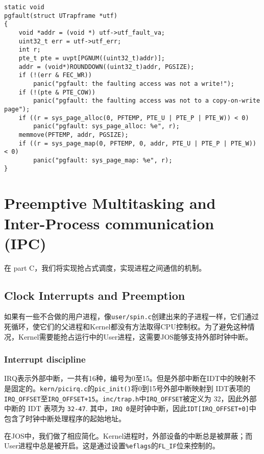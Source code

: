 \documentclass[11pt]{article}
\begin{document}
\begin{lstlisting}[title=lib/fork.c]
static void
pgfault(struct UTrapframe *utf)
{
	void *addr = (void *) utf->utf_fault_va;
	uint32_t err = utf->utf_err;
	int r;
 	pte_t pte = uvpt[PGNUM((uint32_t)addr)];
	addr = (void*)ROUNDDOWN((uint32_t)addr, PGSIZE);
	if (!(err & FEC_WR))
		panic("pgfault: the faulting access was not a write!");
	if (!(pte & PTE_COW))
		panic("pgfault: the faulting access was not to a copy-on-write page");
	if ((r = sys_page_alloc(0, PFTEMP, PTE_U | PTE_P | PTE_W)) < 0)
		panic("pgfault: sys_page_alloc: %e", r);
	memmove(PFTEMP, addr, PGSIZE); 
	if ((r = sys_page_map(0, PFTEMP, 0, addr, PTE_U | PTE_P | PTE_W)) < 0)
		panic("pgfault: sys_page_map: %e", r);
}
\end{lstlisting}
\section{Preemptive Multitasking and Inter-Process communication (IPC)}
在 part C，我们将实现抢占式调度，实现进程之间通信的机制。
\subsection{Clock Interrupts and Preemption}
如果有一些不合做的用户进程，像\lstinline|user/spin.c|创建出来的子进程一样，它们通过死循环，使它们的父进程和Kernel都没有方法取得CPU控制权。为了避免这种情况，Kernel需要能抢占运行中的User进程，这需要JOS能够支持外部时钟中断。 

\subsubsection{Interrupt discipline}
IRQ表示外部中断，一共有16种，编号为0至15。但是外部中断在IDT中的映射不是固定的。\lstinline|kern/picirq.c|的\lstinline|pic_init()|将0到15号外部中断映射到 IDT表项的\lstinline|IRQ_OFFSET|至\lstinline|IRQ_OFFSET+15|。\lstinline|inc/trap.h|中\lstinline|IRQ_OFFSET|被定义为 32，因此外部中断的 IDT 表项为 \lstinline|32-47|. 其中，\lstinline|IRQ 0|是时钟中断，因此\lstinline|IDT[IRQ_OFFSET+0]|中包含了时钟中断处理程序的起始地址。 

在JOS中，我们做了相应简化。Kernel进程时，外部设备的中断总是被屏蔽；而User进程中总是被开启。这是通过设置\lstinline|%eflags|的\lstinline|FL_IF|位来控制的。
\end{document}
